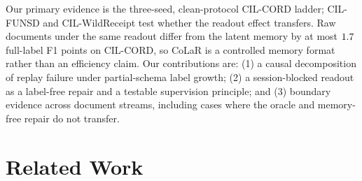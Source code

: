 \documentclass[10pt,twocolumn,letterpaper]{article}
\begin{document}
Our primary evidence is the three-seed, clean-protocol CIL-CORD ladder; CIL-FUNSD and CIL-WildReceipt test whether the readout effect transfers. Raw documents under the same readout differ from the latent memory by at most $1.7$ full-label F1 points on CIL-CORD, so CoLaR is a controlled memory format rather than an efficiency claim. Our contributions are: (1) a causal decomposition of replay failure under partial-schema label growth; (2) a session-blocked readout as a label-free repair and a testable supervision principle; and (3) boundary evidence across document streams, including cases where the oracle and memory-free repair do not transfer.

\begin{table}[t]
\centering\footnotesize
\setlength{\tabcolsep}{3pt}
\caption{\textbf{The hypothesis ladder} on CIL-CORD with LayoutLMv3, unless stated (AF: average forgetting, mean over seeds; other cells: mean $\pm$ s.d. over three seeds; $^{n=k}$: $k$ seeds; $^\dagger$legacy protocol). $^{r}$Oracle: stored documents relabelled with their true labels (\cref{sec:h1}). $^{e}$ER also trains every layer and keeps $200$ raw documents (\cref{sec:h0}). $^{w}$Trains every layer. The pre-session row of H1 also tests H2.}
\label{tab:ladder}

\end{table}

\section{Related Work}
\label{sec:related}
\end{document}
